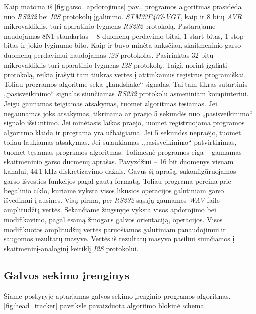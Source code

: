 \documentclass[]{vgtuef}
\begin{document}
Kaip matoma iš \ref{fig:garso_apdorojimas} pav., programos algoritmas prasideda nuo \textit{RS232} bei \textit{I2S} protokolų įgalinimo. \textit{STM32F407-VGT}, kaip ir 8 bitų \textit{AVR} mikrovaldiklis, turi aparatinio lygmens \textit{RS232} protokolą. Pastarajame naudojamas 8N1 standartas – 8 duomenų perdavimo bitai, 1 start bitas, 1 stop bitas ir jokio lyginumo bito. Kaip ir buvo minėta anksčiau, skaitmeninio garso duomenų perdavimui naudojamas \textit{I2S} protokolas. Pasirinktas 32 bitų mikrovaldiklis turi aparatinio lygmens \textit{I2S} protokolą. Taigi, norint įgalinti protokolą, reikia įrašyti tam tiukras vertes į atitinkamus registrus programiškai. Toliau programos algoritme seka „handshake“ signalas. Tai tam tikras sutartinis „pasisveikinimo“ signalas siunčiamas \textit{RS232} protokolu asmeniniam kompiuteriui. Jeigu gaunamas teigiamas atsakymas, tuomet algoritmas tęsiamas. Jei negaunamas joks atsakymas, tikrinama ar praėjo 5 sekundės nuo „pasisveikinimo“ signalo išsiuntimo. Jei minėtasis laikas praėjo, tuomet registruojama programos algoritmo klaida ir programa yra užbaigiama. Jei 5 sekundės nepraėjo, tuomet toliau laukiamas atsakymas. Jei sulaukiamas „pasisveikinimo“ patvirtinimas, tuomet tęsiamas programos algoritmas. Tolimesnė programos eiga – gaunamas skaitmeninio garso duomenų aprašas. Pavyzdžiui – 16 bit duomenys vienam kanalui, 44,1 kHz diskretizavimo dažnis. Gavus šį aprašą, sukonfigūruojamos garso išvesties funkcijos pagal gautą formatą. Toliau programa pereina prie begalinio ciklo, kuriame vyksta visos likusios operacijos galutiniam garso išvedimui į ausines. Visų pirma, per \textit{RS232} sąsają gaunamos \textit{WAV} failo amplitudžių vertės. Sekančiame žingsnyje vyksta visos apdorojimo bei modifikavimo, pagal esamą žmogaus galvos orientaciją, operacijos. Visos modifikuotos amplitudžių vertės paruošiamos galutiniam panaudojimui ir saugomos rezultatų masyve. Vertės iš rezultatų masyvo paeiliui siunčiamos į skaitmeninį-analoginį keitiklį \textit{I2S} protokolui.

\subsection{Galvos sekimo įrenginys}

Šiame poskyryje aptariamas galvos sekimo įrenginio programos algoritmas. \ref{fig:head_tracker} paveiksle pavaizduota algoritmo blokinė schema.
\end{document}
